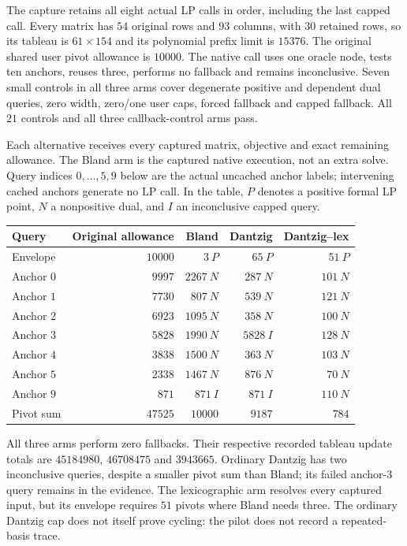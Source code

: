 The capture retains all eight actual LP calls in order, including the
last capped call.  Every matrix has $54$ original rows and $93$ columns,
with $30$ retained rows, so its tableau is $61\times154$ and its polynomial
prefix limit is $15376$.  The original shared user pivot allowance is
$10000$.  The native call uses one oracle node, tests ten anchors, reuses
three, performs no fallback and remains inconclusive.  Seven small
controls in all three arms cover degenerate positive and dependent dual
queries, zero width, zero/one user caps, forced fallback and capped
fallback.  All $21$ controls and all three callback-control arms pass.

Each alternative receives every captured matrix, objective and exact
remaining allowance.  The Bland arm is the captured native execution,
not an extra solve.  Query indices $0,\ldots,5,9$ below are the actual
uncached anchor labels; intervening cached anchors generate no LP call.
In the table, $P$ denotes a positive formal LP point, $N$ a nonpositive
dual, and $I$ an inconclusive capped query.
\begin{center}
\begin{tabular}{lrrrr}
\toprule
Query & Original allowance & Bland & Dantzig & Dantzig--lex \\
\midrule
Envelope & $10000$ & $3\ P$ & $65\ P$ & $51\ P$\\
Anchor $0$ & $9997$ & $2267\ N$ & $287\ N$ & $101\ N$\\
Anchor $1$ & $7730$ & $807\ N$ & $539\ N$ & $121\ N$\\
Anchor $2$ & $6923$ & $1095\ N$ & $358\ N$ & $100\ N$\\
Anchor $3$ & $5828$ & $1990\ N$ & $5828\ I$ & $128\ N$\\
Anchor $4$ & $3838$ & $1500\ N$ & $363\ N$ & $103\ N$\\
Anchor $5$ & $2338$ & $1467\ N$ & $876\ N$ & $70\ N$\\
Anchor $9$ & $871$ & $871\ I$ & $871\ I$ & $110\ N$\\
\midrule
Pivot sum & $47525$ & $10000$ & $9187$ & $784$\\
\bottomrule
\end{tabular}
\end{center}
All three arms perform zero fallbacks.  Their respective recorded tableau
update totals are $45184980$, $46708475$ and $3943665$.  Ordinary Dantzig
has two inconclusive queries, despite a smaller pivot sum than Bland;
its failed anchor-$3$ query remains in the evidence.  The lexicographic
arm resolves every captured input, but its envelope requires $51$ pivots
where Bland needs three.  The ordinary Dantzig cap does not itself prove
cycling: the pilot does not record a repeated-basis trace.

